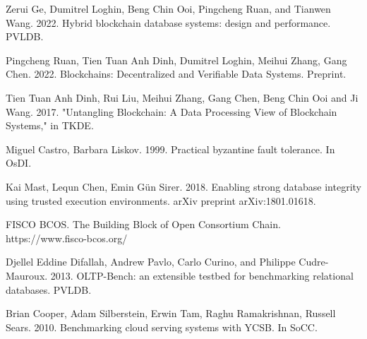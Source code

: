 \documentclass[11pt,dvipdfm]{article}
\begin{document}
\begin{thebibliography}{10}
\begin{small}
 Zerui Ge, Dumitrel Loghin, Beng Chin Ooi, Pingcheng Ruan, and Tianwen Wang. 2022. Hybrid blockchain database systems: design and performance. PVLDB.

 Pingcheng Ruan, Tien Tuan Anh Dinh, Dumitrel Loghin, Meihui Zhang, Gang Chen. 2022. Blockchains: Decentralized and Verifiable Data Systems. Preprint.

 Tien Tuan Anh Dinh, Rui Liu, Meihui Zhang, Gang Chen, Beng Chin Ooi and Ji Wang. 2017. "Untangling Blockchain: A Data Processing View of Blockchain Systems," in TKDE.

 Miguel Castro, Barbara Liskov. 1999. Practical byzantine fault tolerance. In OsDI.

 Kai Mast, Lequn Chen, Emin Gün Sirer. 2018. Enabling strong database integrity using trusted execution environments. arXiv preprint arXiv:1801.01618.

 FISCO BCOS. The Building Block of Open Consortium Chain. https://www.fisco-bcos.org/

 Djellel Eddine Difallah, Andrew Pavlo, Carlo Curino, and Philippe Cudre-Mauroux. 2013. OLTP-Bench: an extensible testbed for benchmarking relational databases. PVLDB.

 Brian Cooper, Adam Silberstein, Erwin Tam, Raghu Ramakrishnan, Russell Sears. 2010. Benchmarking cloud serving systems with YCSB. In SoCC.

\end{small}
\end{thebibliography}
\end{document}
